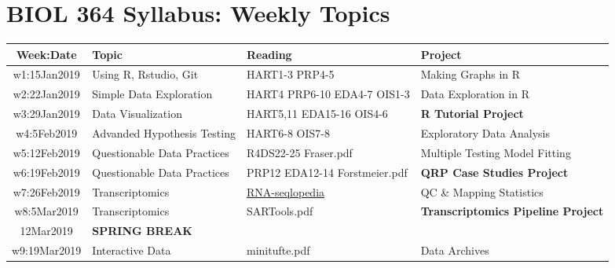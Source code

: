 \documentclass[11pt]{article} %
\begin{document}
\section{BIOL 364 Syllabus: Weekly Topics}
\begin{table}[ht] 
	\centering %
	\begin{tabular}{| c | p{5cm} | p{3cm} | p{5.5cm} |} %
	\hline %
	{\bf Week:Date} & {\bf Topic} & {\bf Reading} & {\bf Project}  \\ %
	\hline 
	\hline %
  w1:15Jan2019 & Using R, Rstudio, Git & HART1-3 \newline PRP4-5 & Making Graphs in R \\ %
	\hline
	w2:22Jan2019 & Simple Data Exploration & HART4 \newline PRP6-10 \newline EDA4-7 \newline OIS1-3 & Data Exploration in R \\ 
	\hline
	w3:29Jan2019 & Data Visualization & HART5,11 \newline EDA15-16 \newline OIS4-6 & {\bf R Tutorial Project}\\ 
	\hline 
	w4:5Feb2019 & Advanded Hypothesis Testing & HART6-8 \newline OIS7-8 & Exploratory Data Analysis \\ 
	\hline 
	w5:12Feb2019 & Questionable Data Practices & R4DS22-25 \newline Fraser.pdf & Multiple Testing \newline Model Fitting \\ 
	\hline 
	w6:19Feb2019 & Questionable Data Practices & PRP12 \newline EDA12-14 \newline Forstmeier.pdf & {\bf QRP Case Studies Project} \\ 
	\hline 
	w7:26Feb2019 & Transcriptomics & \href{https://rnaseq.uoregon.edu/}{RNA-seqlopedia} & QC \& Mapping Statistics\\ 
	\hline 
	w8:5Mar2019 & Transcriptomics  & SARTools.pdf & {\bf Transcriptomics Pipeline Project}\\ 
	\hline 
	12Mar2019 & {\bf SPRING BREAK} &  &  \\ 
	\hline
	w9:19Mar2019 & Interactive Data & minitufte.pdf & Data Archives \newline {\bf TAKEHOME MIDTERM} \\ 

\end{tabular}
\end{table}
\end{document}
